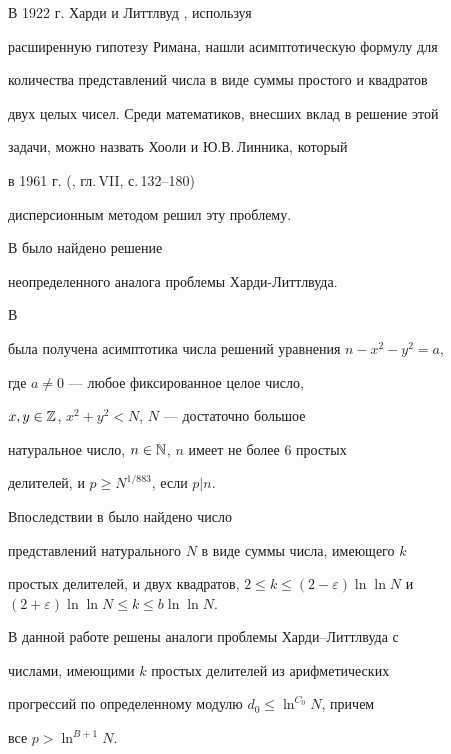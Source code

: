 \maketitle


\label{begin}





В 1922 г. Харди и Литтлвуд \cite{hardy}, используя


расширенную гипотезу Римана, нашли асимптотическую формулу для


количества представлений числа в виде суммы простого и квадратов


двух целых чисел. Среди математиков, внесших вклад в решение этой


задачи, можно назвать Хооли \cite{st-hooli} и Ю.В.\,Линника, который


в 1961 г. (\cite{linnik}, гл.\,VII, с.\,132--180)


дисперсионным методом решил эту проблему.


В \cite{bred} было найдено решение


неопределенного аналога проблемы Харди-Литтлвуда.


В \cite{pija1}


была получена асимптотика числа решений уравнения $n-x^2-y^2=a$,


где $a\ne 0$ --- любое фиксированное целое число,


$x,y \in \Bbb Z$, $x^2 + y^2 < N$, $N$ --- достаточно большое


натуральное число, $n \in \Bbb N$, $n$ имеет не более 6 простых


делителей, и $p \ge N^{1/883}$, если $p|n$.


Впоследствии в \cite{har-lit} было найдено число


представлений натурального $N$ в виде суммы числа, имеющего $k$


простых делителей, и двух квадратов, $2 \le k \le (2- \varepsilon)


\ln \ln N$ и $(2+ \varepsilon) \ln \ln N \le k \le b \ln \ln N$.





В данной работе решены аналоги проблемы Харди--Литтлвуда с


числами, имеющими $k$ простых делителей из арифметических


прогрессий по определенному модулю $d_0 \le \ln^{C_0} N$, причем


все $p > \ln^{B+1} N$.





